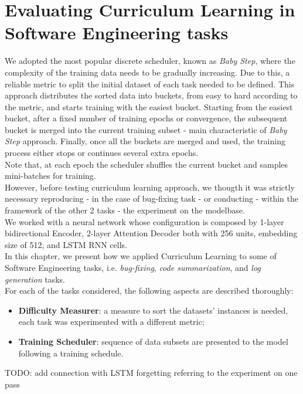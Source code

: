 \chapter{Evaluating Curriculum Learning in Software Engineering tasks}
\label{chapter:chap4}
We adopted the most popular discrete scheduler, known as \textit{Baby Step}, where the complexity of the training
data needs to be gradually increasing. Due to this, a reliable metric to split the initial dataset of each task needed to be defined.
This approach distributes the sorted data into buckets, from easy to hard according to the metric, and starts training with the easiest bucket. 
Starting from the easiest bucket, after a fixed number of training epochs or convergence, the subsequent bucket is merged
into the current training subset - main characteristic of \textit{Baby Step} approach.
Finally, once all the buckets are merged and used, the
training process either stops or continues several extra epochs.\\
Note that, at each epoch the scheduler shuffles the current bucket and samples mini-batches for training.\\

However, before testing curriculum learning approach, we thougth it was strictly necessary reproducing - in the case 
of bug-fixing task - or conducting -  within the framework of the other 2 tasks - the experiment on the modelbase.\\
We worked with a neural network whose configuration is composed by 1-layer bidirectional Encoder, 2-layer Attention 
Decoder both with 256 units, embedding size of 512, and LSTM RNN cells.\\

In this chapter, we present how we applied Curriculum Learning to some of Software
Engineering tasks, i.e. \textit{bug-fixing}, \textit{code summarization}, and \textit{log generation}
tasks. \\
For each of the tasks considered, the following aspects are described thoroughly:
\begin{itemize}
    \item \textbf{Difficulty Measurer}: a measure to sort the datasets' instances is needed, each task was experimented with a different metric; 
    \item \textbf{Training Scheduler}: sequence of data subsets are presented to the model following a training schedule.
\end{itemize}

TODO: add connection with LSTM forgetting referring to the experiment on one pass

